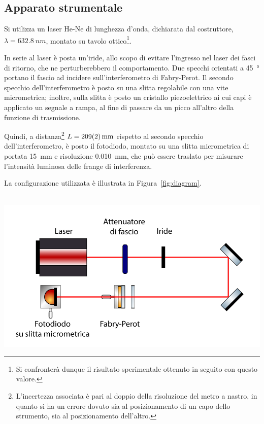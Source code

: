 \documentclass[10pt,oneside,a4paper]{article}
\newenvironment{Figure}
  {\par\medskip\noindent\minipage{\linewidth}}
  {\endminipage\par\medskip}
\begin{document}
\begin{multicols}{2}
\section{Apparato strumentale}

Si utilizza un laser He-Ne di lunghezza d'onda, dichiarata dal costruttore, $\lambda = \SI{632.8}{nm}$, montato su tavolo ottico\footnote{Si confronterà dunque il risultato sperimentale ottenuto in seguito con questo valore.}. 

In serie al laser è posta un'iride, allo scopo di evitare l'ingresso nel laser dei fasci di ritorno, che ne perturberebbero il comportamento. Due specchi orientati a \SI{45}{\degree} portano il fascio ad incidere sull'interferometro di Fabry-Perot. Il secondo specchio dell'interferometro è posto su una slitta regolabile con una vite micrometrica; inoltre, sulla slitta è posto un cristallo piezoelettrico ai cui capi è applicato un segnale a rampa, al fine di passare da un picco all'altro della funzione di trasmissione. 

Quindi, a distanza\footnote{L'incertezza associata è pari al doppio della risoluzione del metro a nastro, in quanto si ha un errore dovuto sia al posizionamento di un capo dello strumento, sia al posizionamento dell'altro.} $L = \SI{209 \pm 2}{mm}$ rispetto al secondo specchio dell'interferometro, è posto il fotodiodo, montato su una slitta micrometrica di portata \SI{15}{mm} e risoluzione \SI{0.010}{mm}, che può essere traslato per misurare l'intensità luminosa delle frange di interferenza.

La configurazione utilizzata è illustrata in Figura~\ref{fig:diagram}.

\begin{Figure}
	\begin{center}
	\hbox{\hspace{-0.8cm}
	\includegraphics[width=1.1\linewidth]{diagram.png}}
	\label{fig:diagram}
	\end{center}
\end{Figure}


\end{multicols}
\end{document}
